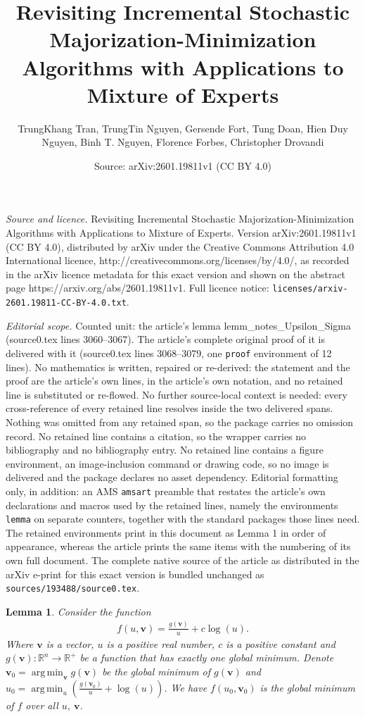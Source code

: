 \documentclass[10pt,a4paper]{amsart}
\title{Revisiting Incremental Stochastic Majorization-Minimization Algorithms with Applications to Mixture of Experts}
\author{TrungKhang Tran, TrungTin Nguyen, Gersende Fort, Tung Doan, Hien Duy Nguyen, Binh T. Nguyen, Florence Forbes, Christopher Drovandi}
\date{Source: arXiv:2601.19811v1 (CC BY 4.0)}
\newtheorem{lemma}{Lemma}
\newcommand{\R}{\mathbb{R}}
\DeclareMathOperator*{\argmin}{arg\,min}
\def\evu{{u}}
\newcommand{\nn}{\nonumber} %
\def\vv{{\bm{v}}}
\begin{document}
\maketitle

\noindent\emph{Source and licence.} Revisiting Incremental Stochastic Majorization-Minimization Algorithms with Applications to Mixture of Experts. Version arXiv:2601.19811v1 (CC BY 4.0), distributed by arXiv under the Creative Commons Attribution 4.0 International licence, http://creativecommons.org/licenses/by/4.0/, as recorded in the arXiv licence metadata for this exact version and shown on the abstract page https://arxiv.org/abs/2601.19811v1. Full licence notice: \texttt{licenses/arxiv-2601.19811-CC-BY-4.0.txt}.\par\smallskip

\noindent\textit{Editorial scope.} Counted unit: the article's lemma lemm\_notes\_Upsilon\_Sigma (source0.tex lines 3060--3067). The article's complete original proof of it is delivered with it (source0.tex lines 3068--3079, one \texttt{proof} environment of 12 lines). No mathematics is written, repaired or re-derived: the statement and the proof are the article's own lines, in the article's own notation, and no retained line is substituted or re-flowed.  No further source-local context is needed: every cross-reference of every retained line resolves inside the two delivered spans.  Nothing was omitted from any retained span, so the package carries no omission record.  No retained line contains a citation, so the wrapper carries no bibliography and no bibliography entry.  No retained line contains a figure environment, an image-inclusion command or drawing code, so no image is delivered and the package declares no asset dependency.  Editorial formatting only, in addition: an AMS \texttt{amsart} preamble that restates the article's own declarations and macros used by the retained lines, namely the environments \texttt{lemma} on separate counters, together with the standard packages those lines need.  The retained environments print in this document as Lemma 1 in order of appearance, whereas the article prints the same items with the numbering of its own full document.  The complete native source of the article as distributed in the arXiv e-print for this exact version is bundled unchanged as \texttt{sources/193488/source0.tex}.
\begin{lemma} \label{lemm_notes_Upsilon_Sigma}
    Consider the function 
    \begin{align}
        f(\evu,\vv)=\frac{g(\vv)}{\evu}+c\log(\evu). \nn
    \end{align}
    Where $\vv$ is a vector, $\evu$ is a positive real number, $c$ is a positive constant and $g(\vv): \R^{n}\rightarrow \R^{+}$ be a function that has exactly one global minimum. 
    Denote $\vv_0=\displaystyle\argmin_{\vv}g(\vv)$ be the global minimum of $g(\vv)$ and $\evu_0=\displaystyle\argmin_{\evu}\left(\frac{g(\vv_0)}{\evu}+\log(\evu)\right)$. We have $f(\evu_0,\vv_0)$ is the global minimum of $f$ over all $\evu,~\vv$.
\end{lemma}
\end{document}
